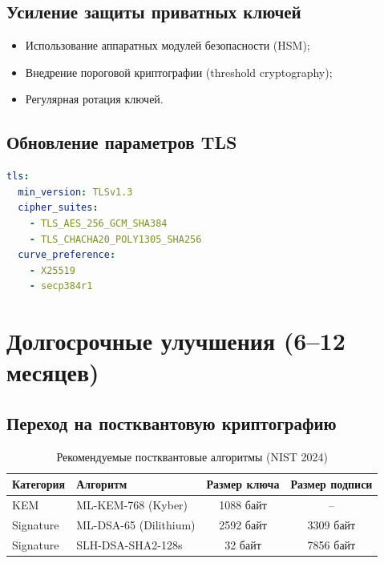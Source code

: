 \documentclass[a4paper,14pt]{extreport}
\begin{document}
\subsection{Усиление защиты приватных ключей}

\begin{itemize}
    \item Использование аппаратных модулей безопасности (HSM);
    \item Внедрение пороговой криптографии (threshold cryptography);
    \item Регулярная ротация ключей.
\end{itemize}

\subsection{Обновление параметров TLS}

\begin{lstlisting}[language=YAML,caption=Рекомендуемая конфигурация TLS,captionpos=b]
tls:
  min_version: TLSv1.3
  cipher_suites:
    - TLS_AES_256_GCM_SHA384
    - TLS_CHACHA20_POLY1305_SHA256
  curve_preference:
    - X25519
    - secp384r1
\end{lstlisting}

\section{Долгосрочные улучшения (6--12 месяцев)}

\subsection{Переход на постквантовую криптографию}

\begin{table}[H]
\centering
\caption{Рекомендуемые постквантовые алгоритмы (NIST 2024)}
\label{tab:pqc_algorithms}
\begin{tabular}{|l|l|c|c|}
\hline
\textbf{Категория} & \textbf{Алгоритм} & \textbf{Размер ключа} & \textbf{Размер подписи} \\
\hline
KEM & ML-KEM-768 (Kyber) & 1088 байт & -- \\
Signature & ML-DSA-65 (Dilithium) & 2592 байт & 3309 байт \\
Signature & SLH-DSA-SHA2-128s & 32 байт & 7856 байт \\
\hline
\end{tabular}
\end{table}
\end{document}
